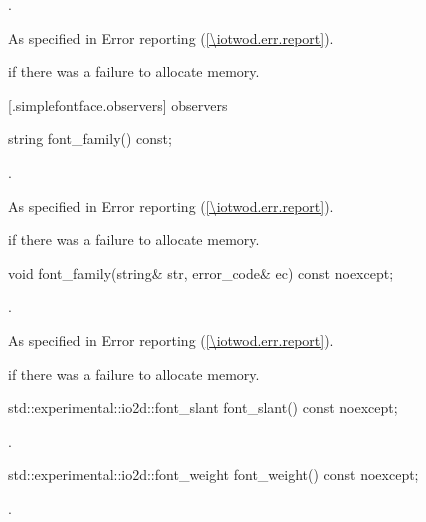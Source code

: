 \begin{itemdescr}
	\pnum
	.

	\pnum
	\throws
	As specified in Error reporting (\ref{\iotwod.err.report}).

	\pnum
	\errors
	 if there was a failure to allocate memory.
	
\end{itemdescr}

 [\iotwod.simplefontface.observers] { observers}

\begin{itemdecl}
    string font_family() const;
\end{itemdecl}
\begin{itemdescr}
	\pnum
	\returns
	.

	\pnum
	\throws
	As specified in Error reporting (\ref{\iotwod.err.report}).

	\pnum
	\errors
	 if there was a failure to allocate memory.
	
\end{itemdescr}

\begin{itemdecl}
    void font_family(string& str, error_code& ec) const noexcept;
\end{itemdecl}
\begin{itemdescr}
	\pnum
	\effects
	.

	\pnum
	\throws
	As specified in Error reporting (\ref{\iotwod.err.report}).

	\pnum
	\errors
	 if there was a failure to allocate memory.
	
\end{itemdescr}

\begin{itemdecl}
    std::experimental::io2d::font_slant font_slant() const noexcept;
\end{itemdecl}
\begin{itemdescr}
	\pnum
	\returns
	.
\end{itemdescr}

\begin{itemdecl}
    std::experimental::io2d::font_weight font_weight() const noexcept;
\end{itemdecl}
\begin{itemdescr}
	\pnum
	\returns
	.
\end{itemdescr}
